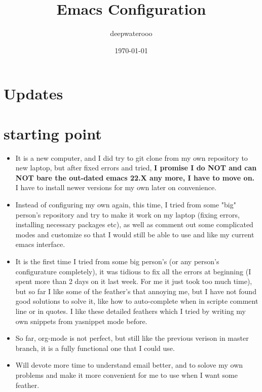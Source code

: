 \documentclass[9pt, b5paper]{article}
\author{deepwaterooo}
\date{\today}
\title{Emacs Configuration}
\begin{document}
\maketitle
\tableofcontents


\section{Updates}
\label{sec:org5f8fe13}
\section{starting point}
\label{sec:org8791210}
\begin{itemize}
\item It is a new computer, and I did try to git clone from my own repository to new laptop, but after fixed errors and tried, \textbf{I promise I do NOT and can NOT bare the out-dated emacs 22.X any more, I have to move on.} I have to install newer versions for my own later on convenience.
\item Instead of configuring my own again, this time, I tried from some "big" person's repository and try to make it work on my laptop (fixing errors, installing necessary packages etc), as well as comment out some complicated modes and customize so that I would still be able to use and like my current emacs interface.
\item It is the first time I tried from some big person's (or any person's configurature completely), it was tidious to fix all the errors at beginning (I spent more than 2 days on it last week. For me it just took too much time), but so far I like some of the feather's that annoying me, but I have not found good solutions to solve it, like how to auto-complete when in scripte comment line or in quotes. I like these detailed feathers which I tried by writing my own snippets from yasnippet mode before.
\item So far, org-mode is not perfect, but still like the previous verison in master branch, it is a fully functional one that I could use.
\item Will devote more time to understand email better, and to solove my own problems and make it more convenient for me to use when I want some feather.
\end{itemize}
\end{document}
